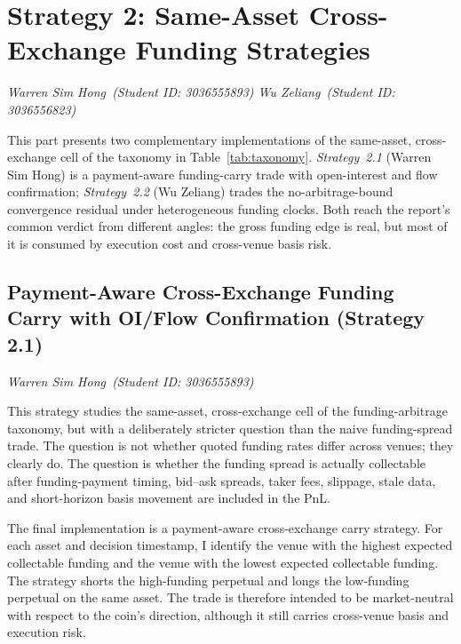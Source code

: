 \documentclass[10pt,twocolumn,a4paper]{article}
\begin{document}
\clearpage
\section{Strategy 2: Same-Asset Cross-Exchange Funding Strategies}
\label{sec:strat2}
\begingroup\par\vspace{-2pt}%
{\small\itshape Warren Sim Hong\ (Student ID: 3036555893)\quad
 Wu Zeliang\ (Student ID: 3036556823)}\par\vspace{4pt}\endgroup

This part presents two complementary implementations of the same-asset,
cross-exchange cell of the taxonomy in Table~\ref{tab:taxonomy}.
\emph{Strategy~2.1} (Warren Sim Hong) is a payment-aware funding-carry trade
with open-interest and flow confirmation; \emph{Strategy~2.2} (Wu Zeliang)
trades the no-arbitrage-bound convergence residual under heterogeneous
funding clocks.  Both reach the report's common verdict from different
angles: the gross funding edge is real, but most of it is consumed by
execution cost and cross-venue basis risk.

\subsection{Payment-Aware Cross-Exchange Funding Carry with OI/Flow Confirmation (Strategy 2.1)}
\begingroup\par\vspace{-2pt}%
{\small\itshape Warren Sim Hong\ (Student ID: 3036555893)}\par\vspace{4pt}\endgroup

This strategy studies the same-asset, cross-exchange cell of the funding-arbitrage taxonomy, but with a deliberately stricter question than the naive funding-spread trade. The question is not whether quoted funding rates differ across venues; they clearly do. The question is whether the funding spread is actually collectable after funding-payment timing, bid--ask spreads, taker fees, slippage, stale data, and short-horizon basis movement are included in the PnL.

The final implementation is a payment-aware cross-exchange carry strategy. For each asset and decision timestamp, I identify the venue with the highest expected collectable funding and the venue with the lowest expected collectable funding. The strategy shorts the high-funding perpetual and longs the low-funding perpetual on the same asset. The trade is therefore intended to be market-neutral with respect to the coin's direction, although it still carries cross-venue basis and execution risk.
\end{document}
